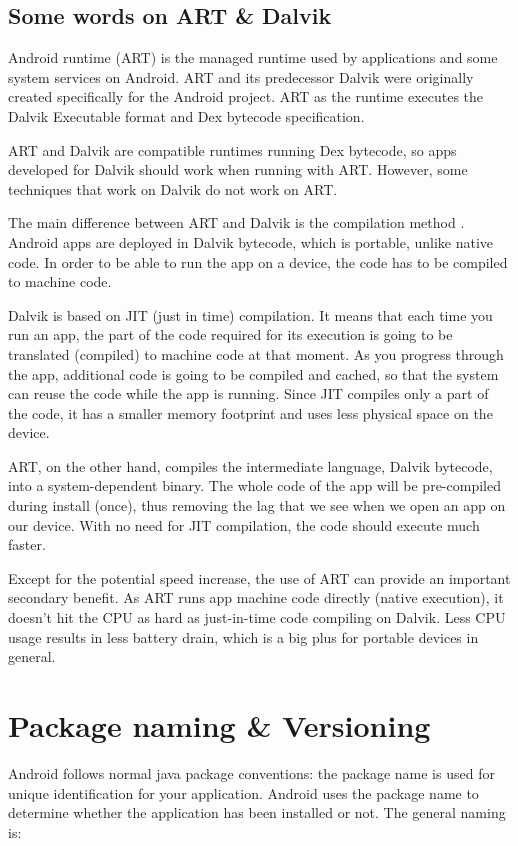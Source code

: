 \subsection{Some words on ART \& Dalvik}
Android runtime (ART) \cite{Android2019} is the managed runtime used by applications and some system services on Android. ART and its predecessor Dalvik were originally created specifically for the Android project. ART as the runtime executes the Dalvik Executable format and Dex bytecode specification.

ART and Dalvik are compatible runtimes running Dex bytecode, so apps developed for Dalvik should work when running with ART. However, some techniques that work on Dalvik do not work on ART. 

The main difference between ART and Dalvik is the compilation method \cite{Vitas2013}. Android apps are deployed in Dalvik bytecode, which is portable, unlike native code. In order to be able to run the app on a device, the code has to be compiled to machine code.

Dalvik is based on JIT (just in time) compilation. It means that each time you run an app, the part of the code required for its execution is going to be translated (compiled) to machine code at that moment. As you progress through the app, additional code is going to be compiled and cached, so that the system can reuse the code while the app is running. Since JIT compiles only a part of the code, it has a smaller memory footprint and uses less physical space on the device.

ART, on the other hand, compiles the intermediate language, Dalvik bytecode, into a system-dependent binary. The whole code of the app will be pre-compiled during install (once), thus removing the lag that we see when we open an app on our device. With no need for JIT compilation, the code should execute much faster.

Except for the potential speed increase, the use of ART can provide an important secondary benefit. As ART runs app machine code directly (native execution), it doesn't hit the CPU as hard as just-in-time code compiling on Dalvik. Less CPU usage results in less battery drain, which is a big plus for portable devices in general.


\section{Package naming \& Versioning}
Android follows normal java package conventions: the package name is used for unique identification for your application. Android uses the package name to determine whether the application has been installed or not. The general naming is:

